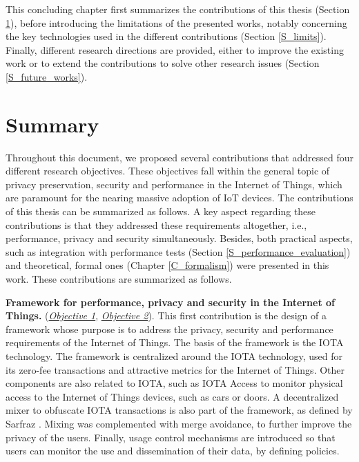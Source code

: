 \minitoc


This concluding chapter first summarizes the contributions of this thesis (Section \ref{S_summary}), before introducing the limitations of the presented works, notably concerning the key technologies used 
in the different contributions (Section \ref{S_limits}). Finally, different research directions are provided, either to improve the existing work or to extend the contributions to solve other research issues (Section \ref{S_future_works}). 

\section{Summary}
\label{S_summary}

Throughout this document, we proposed several contributions that addressed four different research objectives. These objectives fall within the general topic of privacy preservation, security and performance 
in the Internet of Things, which are paramount for the nearing massive adoption of IoT devices. The contributions of this thesis can be summarized as follows. 
A key aspect regarding these contributions is that they addressed these requirements altogether, i.e., performance, privacy and security simultaneously. Besides,
both practical aspects, such as integration with performance tests (Section \ref{S_performance_evaluation}) and theoretical, formal ones (Chapter \ref{C_formalism})
were presented in this work. These contributions are summarized as follows.

\textbf{Framework for performance, privacy and security in the Internet of Things.} (\hyperref[obj:1]{\emph{Objective 1}}, \hyperref[obj:23]{\emph{Objective 2}}). 
This first contribution is the design of a framework whose purpose is to address the privacy, security and
performance requirements of the Internet of Things. The basis of the framework is the IOTA technology. The framework is centralized around the IOTA technology, used for its zero-fee transactions and 
attractive metrics for the Internet of Things. Other components are also related to IOTA, such as IOTA Access to monitor physical access to the Internet of Things devices, such as cars or doors. A decentralized mixer 
to obfuscate IOTA transactions is also part of the framework, as defined by Sarfraz \cite{Sarfraz2019}. Mixing was complemented with merge avoidance, to further improve the privacy of the users. Finally, usage control mechanisms are introduced so that users can monitor the use and dissemination of their data,
by defining policies.

